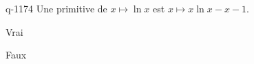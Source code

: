 \begin{truefalse}{q-1174}
Une primitive de $x\mapsto\ln x$ est $x\mapsto x\ln x -x-1$.
\item* Vrai
\item Faux
\end{truefalse}

